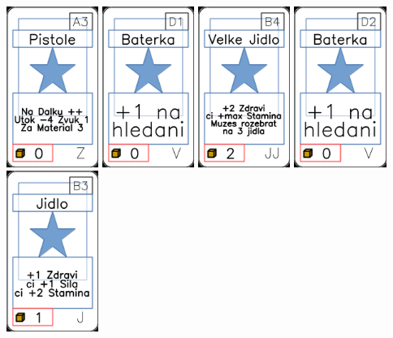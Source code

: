 \documentclass[a4paper]{article}
\begin{document}
	\includegraphics[width=3.0cm]{img-1_92}
	\includegraphics[width=3.0cm]{img-1_75}
	\includegraphics[width=3.0cm]{img-1_38}
	\includegraphics[width=3.0cm]{img-1_76}
	\includegraphics[width=3.0cm]{img-1_7}
\end{document}
